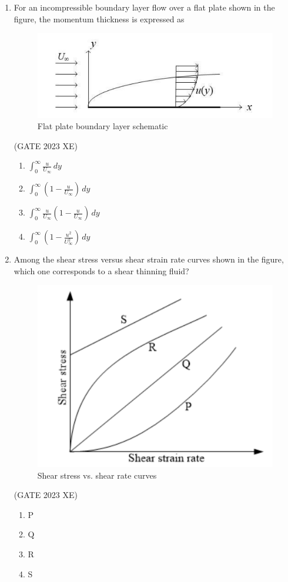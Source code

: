\documentclass[journal,12pt,onecolumn]{IEEEtran}
\begin{document}
\begin{enumerate}
\item For an incompressible boundary layer flow over a flat plate shown in the figure, the
momentum thickness is expressed as

\begin{figure}[htbp]
\centering
\includegraphics[width=0.7\columnwidth]{figs/B/fig2.png}
\caption{Flat plate boundary layer schematic}
\label{fig:figs/B/fig2.png}
\end{figure}
\hfill{(GATE 2023 XE)}
\begin{multicols}{2}
\begin{enumerate}
\item $\displaystyle \int_0^{\infty}\frac{u}{U_\infty}\,dy$
\item $\displaystyle \int_0^{\infty}\left(1-\frac{u}{U_\infty}\right)\,dy$
\item $\displaystyle \int_0^{\infty}\frac{u}{U_\infty}\left(1-\frac{u}{U_\infty}\right)\,dy$
\item $\displaystyle \int_0^{\infty}\left(1-\frac{u^2}{U_\infty^2}\right)\,dy$
\end{enumerate}
\end{multicols}

\newpage

\item Among the shear stress versus shear strain rate curves shown in the figure, which one
corresponds to a shear thinning fluid?

\begin{figure}[htbp]
\centering
\includegraphics[width=0.7\columnwidth]{figs/B/fig3.png}
\caption{Shear stress vs. shear rate curves}
\label{fig:figs/B/fig3.png}
\end{figure}
\hfill{(GATE 2023 XE)}
\begin{multicols}{2}
\begin{enumerate}
\item P
\item Q
\item R
\item S
\end{enumerate}
\end{multicols}


\end{enumerate}
\end{document}
